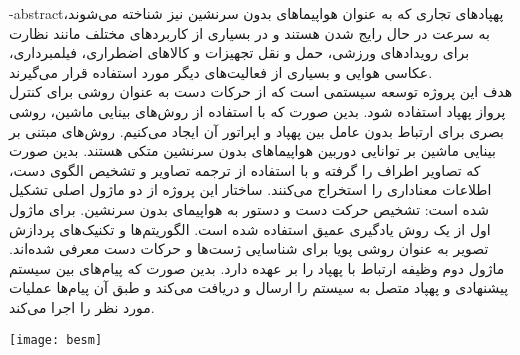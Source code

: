 \department{}
\secondsupervisor{}


\fa-abstract{پهپادهای تجاری که به عنوان هواپیما‌های بدون سرنشین 
نیز شناخته می‌شوند، به سرعت در حال رایج شدن هستند و در بسیاری از کاربردهای مختلف مانند نظارت برای رویدادهای ورزشی، حمل و نقل تجهیزات
 و کالاهای اضطراری، فیلمبرداری، عکاسی هوایی و بسیاری از فعالیت‌های دیگر مورد استفاده قرار می‌گیرند.
  \\
هدف این پروژه توسعه سیستمی است که از حرکات دست به عنوان روشی برای کنترل پرواز پهپاد استفاده شود.
بدین صورت که با استفاده از روش‌های بینایی ماشین، روشی بصری برای ارتباط بدون عامل بین پهپاد و اپراتور آن ایجاد می‌کنیم.
 روش‌های مبتنی بر بینایی ماشین بر توانایی دوربین هواپیماهای بدون سرنشین متکی هستند. بدین صورت که تصاویر اطراف را گرفته و با استفاده
 از  ترجمه تصاویر و تشخیص الگوی دست، اطلاعات معناداری را استخراج می‌کنند. ساختار این پروژه از دو ماژول
 اصلی تشکیل شده است: تشخیص حرکت دست
 و دستور به هواپیمای بدون سرنشین. برای ماژول اول از یک روش
 یادگیری عمیق استفاده شده است. الگوریتم‌ها و تکنیک‌های پردازش تصویر به‌ عنوان روشی پویا برای شناسایی ژست‌ها و
 حرکات دست معرفی شده‌اند. ماژول دوم وظیفه ارتباط با پهپاد را بر عهده دارد. بدین صورت که پیام‌های بین سیستم
 پیشنهادی و پهپاد متصل به سیستم را ارسال و دریافت می‌کند و طبق آن پیام‌ها عملیات مورد نظر را اجرا می‌کند.
  }





\vspace*{7cm}
\thispagestyle{empty}
\begin{center}
\texttt{[image: besm]}
\end{center}